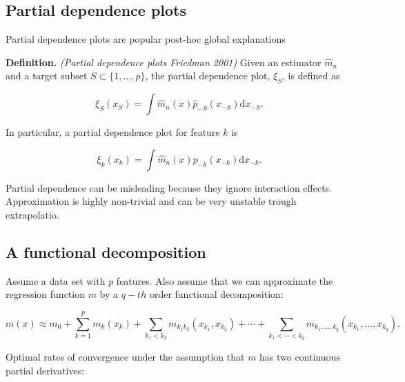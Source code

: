 \documentclass[a4paper,12pt,openany]{book}
\begin{document}
\hypertarget{partial-dependence-plots}{%
\subsection{Partial dependence plots}\label{partial-dependence-plots}}

Partial dependence plots are popular post-hoc global explanations

\textbf{Definition.} \emph{(Partial dependence plots Friedman 2001)} Given an estimator \(\hat m_n\) and a target subset \(S\subset \{1,\dots,p\}\), the partial dependence plot, \(\xi_S\), is defined as

\[
\xi_S(x_S)= \int \hat m_n(x) \hat p_{-S}(x_{-S})\mathrm dx_{-S}.
\]

In particular, a partial dependence plot for feature \(k\) is

\[
\xi_k(x_k)= \int \hat m_n(x) p_{-k}(x_{-k})\mathrm dx_{-k}.
\]

Partial dependence can be misleading because they ignore interaction effects. Approximation is highly non-trivial and can be very unstable trough extrapolatio.

\hypertarget{a-functional-decomposition}{%
\subsection{A functional decomposition}\label{a-functional-decomposition}}

Assume a data set with \(p\) features. Also assume that we can approximate the regression function \(m\) by a \(q-th\) order functional decomposition:

\[
m(x) \approx  m_0+\sum_{k=1}^p  m_k(x_{k}) + \sum_{k_1<k_2}  m_{k_1k_2}(x_{k_1},x_{k_2}) + \cdots +\sum_{k_1<\cdots <k_q}  m_{k_1,\dots,k_q} (x_{k_1},\dots,x_{k_q}).
\]

Optimal rates of convergence under the assumption that \(m\) has
two continuous partial derivatives:
\end{document}
